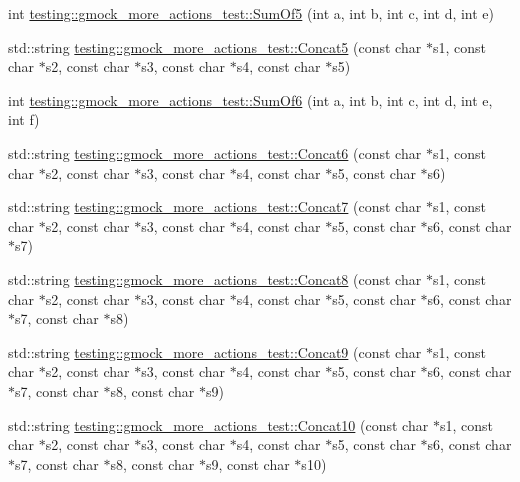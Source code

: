 \begin{DoxyCompactItemize}
\item 
int \mbox{\hyperlink{namespacetesting_1_1gmock__more__actions__test_a38e64569bf08e83c6db22c1fb0fe0af6}{testing\+::gmock\+\_\+more\+\_\+actions\+\_\+test\+::\+Sum\+Of5}} (int a, int b, int c, int d, int e)
\item 
std\+::string \mbox{\hyperlink{namespacetesting_1_1gmock__more__actions__test_ad96d89b9c9dd13ef8df8114e4b430e96}{testing\+::gmock\+\_\+more\+\_\+actions\+\_\+test\+::\+Concat5}} (const char $\ast$s1, const char $\ast$s2, const char $\ast$s3, const char $\ast$s4, const char $\ast$s5)
\item 
int \mbox{\hyperlink{namespacetesting_1_1gmock__more__actions__test_a139632d344348fdfa25111d4e43f70ba}{testing\+::gmock\+\_\+more\+\_\+actions\+\_\+test\+::\+Sum\+Of6}} (int a, int b, int c, int d, int e, int f)
\item 
std\+::string \mbox{\hyperlink{namespacetesting_1_1gmock__more__actions__test_a4ddf77266c433ef69d302bfc68153544}{testing\+::gmock\+\_\+more\+\_\+actions\+\_\+test\+::\+Concat6}} (const char $\ast$s1, const char $\ast$s2, const char $\ast$s3, const char $\ast$s4, const char $\ast$s5, const char $\ast$s6)
\item 
std\+::string \mbox{\hyperlink{namespacetesting_1_1gmock__more__actions__test_a2ed0b2da1e123d5aaef59b0ea37e3844}{testing\+::gmock\+\_\+more\+\_\+actions\+\_\+test\+::\+Concat7}} (const char $\ast$s1, const char $\ast$s2, const char $\ast$s3, const char $\ast$s4, const char $\ast$s5, const char $\ast$s6, const char $\ast$s7)
\item 
std\+::string \mbox{\hyperlink{namespacetesting_1_1gmock__more__actions__test_aa4419cf22a6e6760b8d38828f088cae1}{testing\+::gmock\+\_\+more\+\_\+actions\+\_\+test\+::\+Concat8}} (const char $\ast$s1, const char $\ast$s2, const char $\ast$s3, const char $\ast$s4, const char $\ast$s5, const char $\ast$s6, const char $\ast$s7, const char $\ast$s8)
\item 
std\+::string \mbox{\hyperlink{namespacetesting_1_1gmock__more__actions__test_a302f1938b41c2ce503a7628aa45cd017}{testing\+::gmock\+\_\+more\+\_\+actions\+\_\+test\+::\+Concat9}} (const char $\ast$s1, const char $\ast$s2, const char $\ast$s3, const char $\ast$s4, const char $\ast$s5, const char $\ast$s6, const char $\ast$s7, const char $\ast$s8, const char $\ast$s9)
\item 
std\+::string \mbox{\hyperlink{namespacetesting_1_1gmock__more__actions__test_a4a2fcb45125cd238e4146a4b0c568414}{testing\+::gmock\+\_\+more\+\_\+actions\+\_\+test\+::\+Concat10}} (const char $\ast$s1, const char $\ast$s2, const char $\ast$s3, const char $\ast$s4, const char $\ast$s5, const char $\ast$s6, const char $\ast$s7, const char $\ast$s8, const char $\ast$s9, const char $\ast$s10)

\end{DoxyCompactItemize}
